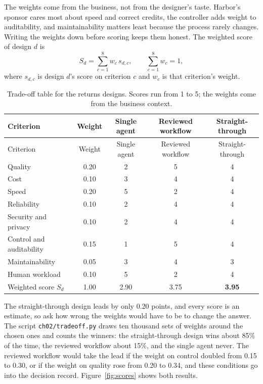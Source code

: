The weights come from the business, not from the designer's taste. Harbor's sponsor cares most about speed and correct credits, the controller adds weight to auditability, and maintainability matters least because the process rarely changes. Writing the weights down before scoring keeps them honest. The weighted score of design $d$ is
\begin{equation}
  S_d = \sum_{c=1}^{8} w_c \, s_{d,c}, \qquad \sum_{c=1}^{8} w_c = 1,
  \label{eq:weighted}
\end{equation}
where $s_{d,c}$ is design $d$'s score on criterion $c$ and $w_c$ is that criterion's weight.

\begingroup
\small
\begin{longtable}{@{}lcccc@{}}
\caption{Trade-off table for the returns designs. Scores run from 1 to 5; the weights come from the business context.}\label{tab:tradeoff}\\
\toprule
\rowcolor{coHead} Criterion & Weight & Single agent & Reviewed workflow & Straight-through \\
\midrule
\endfirsthead
\toprule
\rowcolor{coHead} Criterion & Weight & Single agent & Reviewed workflow & Straight-through \\
\midrule
\endhead
Quality & 0.20 & 2 & 5 & 4 \\
Cost & 0.10 & 3 & 4 & 4 \\
Speed & 0.20 & 5 & 2 & 4 \\
Reliability & 0.10 & 2 & 4 & 4 \\
Security and privacy & 0.10 & 2 & 4 & 4 \\
Control and auditability & 0.15 & 1 & 5 & 4 \\
Maintainability & 0.05 & 3 & 4 & 3 \\
Human workload & 0.10 & 5 & 2 & 4 \\
\midrule
\rowcolor{coAmberBg} Weighted score $S_d$ & 1.00 & 2.90 & 3.75 & \textbf{3.95} \\
\bottomrule
\end{longtable}
\endgroup

The straight-through design leads by only 0.20 points, and every score is an estimate, so ask how wrong the weights would have to be to change the answer. The script \texttt{ch02/tradeoff.py} draws ten thousand sets of weights around the chosen ones and counts the winners: the straight-through design wins about 85\% of the time, the reviewed workflow about 15\%, and the single agent never. The reviewed workflow would take the lead if the weight on control doubled from 0.15 to 0.30, or if the weight on quality rose from 0.20 to 0.34, and these conditions go into the decision record. Figure~\ref{fig:scores} shows both results.

